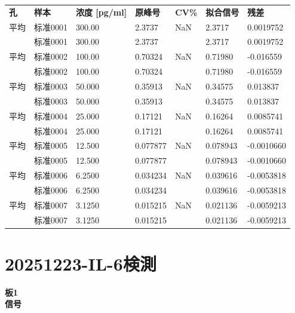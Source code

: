 \documentclass[UTF8,10pt,a4paper,fontset=fandol]{ctexart}
\begin{document}
\small
\begin{tabular}{@{}p{1.0cm}p{2.0cm}p{2.0cm}p{1.8cm}p{1.2cm}p{1.8cm}p{1.8cm}@{}}
\textbf{孔} & \textbf{样本} & \textbf{浓度 [pg/ml]} & \textbf{原峰号} & \textbf{CV\%} & \textbf{拟合信号} & \textbf{残差}\\
平均 & 标准0001 & 300.00 & 2.3737 & NaN & 2.3717 & 0.0019752\\
 & 标准0001 & 300.00 & 2.3737 &  & 2.3717 & 0.0019752\\
平均 & 标准0002 & 100.00 & 0.70324 & NaN & 0.71980 & -0.016559\\
 & 标准0002 & 100.00 & 0.70324 &  & 0.71980 & -0.016559\\
平均 & 标准0003 & 50.000 & 0.35913 & NaN & 0.34575 & 0.013837\\
 & 标准0003 & 50.000 & 0.35913 &  & 0.34575 & 0.013837\\
平均 & 标准0004 & 25.000 & 0.17121 & NaN & 0.16264 & 0.0085741\\
 & 标准0004 & 25.000 & 0.17121 &  & 0.16264 & 0.0085741\\
平均 & 标准0005 & 12.500 & 0.077877 & NaN & 0.078943 & -0.0010660\\
 & 标准0005 & 12.500 & 0.077877 &  & 0.078943 & -0.0010660\\
平均 & 标准0006 & 6.2500 & 0.034234 & NaN & 0.039616 & -0.0053818\\
 & 标准0006 & 6.2500 & 0.034234 &  & 0.039616 & -0.0053818\\
平均 & 标准0007 & 3.1250 & 0.015215 & NaN & 0.021136 & -0.0059213\\
 & 标准0007 & 3.1250 & 0.015215 &  & 0.021136 & -0.0059213\\
\end{tabular}
\normalsize

\newpage

\section*{20251223-IL-6検測}

\textbf{板1}\\
\textbf{信号}
\end{document}
